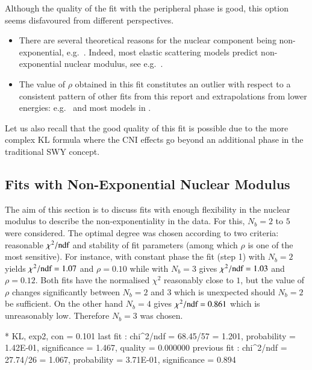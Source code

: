 Although the quality of the fit with the peripheral phase is good, this option seems disfavoured from different perspectives.
\begin{itemize}
\item There are several theoretical reasons for the nuclear component being non-exponential, e.g.~\cite{kmr00-multiPom,kmr12-opacity,kmr15-slope}. Indeed, most elastic scattering models predict non-exponential nuclear modulus, see e.g.~\cite{elegent}.
\item The value of $\rho$ obtained in this fit constitutes an outlier with respect to a consistent pattern of other fits from this report and extrapolations from lower energies: e.g.~\cite{fagundes11,block12,compete} and most models in \cite{elegent}.
\end{itemize}
Let us also recall that the good quality of this fit is possible due to the more complex KL formula where the CNI effects go beyond an additional phase in the traditional SWY concept.


\subsection{Fits with Non-Exponential Nuclear Modulus}
\label{sec:fit exp3}

The aim of this section is to discuss fits with enough flexibility in the nuclear modulus to describe the non-exponentiality in the data. For this, $N_b=2$ to $5$ were considered. The optimal degree was chosen according to two criteria: reasonable $\chi^2/\hbox{ndf}$ and stability of fit parameters (among which $\rho$ is one of the most sensitive). For instance, with constant phase the fit (step 1) with $N_b=2$ yields $\chi^2/\hbox{ndf} = 1.07$ and $\rho = 0.10$ while with $N_b=3$ gives $\chi^2/\hbox{ndf} = 1.03$ and $\rho = 0.12$. Both fits have the normalised $\chi^2$ reasonably close to $1$, but the value of $\rho$ changes significantly between $N_b=2$ and $3$ which is unexpected should $N_b=2$ be sufficient. On the other hand $N_b=4$ gives $\chi^2/\hbox{ndf} = 0.861$ which is unreasonably low. Therefore $N_b=3$ was chosen.

\iffalse
* KL, exp2, con
\rh       =   0.101 
last fit     : chi^2/ndf = 68.45/57 = 1.201, probability = 1.42E-01, significance = 1.467, quality = 0.000000
previous fit : chi^2/ndf = 27.74/26 = 1.067, probability = 3.71E-01, significance = 0.894

